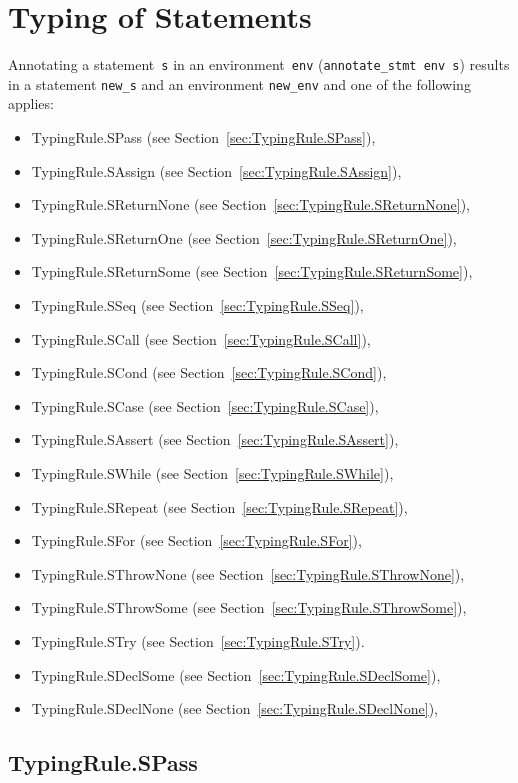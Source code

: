 \documentclass{book}
\begin{document}
\chapter{Typing of Statements}
Annotating a statement~\texttt{s} in an environment~\texttt{env}
(\texttt{annotate\_stmt env s}) results in a statement \texttt{new\_s} and an
environment \texttt{new\_env} and one of the following applies:
\begin{itemize}
\item TypingRule.SPass (see Section~\ref{sec:TypingRule.SPass}),
\item TypingRule.SAssign (see Section~\ref{sec:TypingRule.SAssign}),
\item TypingRule.SReturnNone (see Section~\ref{sec:TypingRule.SReturnNone}),
\item TypingRule.SReturnOne (see Section~\ref{sec:TypingRule.SReturnOne}),
\item TypingRule.SReturnSome (see Section~\ref{sec:TypingRule.SReturnSome}),
\item TypingRule.SSeq (see Section~\ref{sec:TypingRule.SSeq}),
\item TypingRule.SCall (see Section~\ref{sec:TypingRule.SCall}),
\item TypingRule.SCond (see Section~\ref{sec:TypingRule.SCond}),
\item TypingRule.SCase (see Section~\ref{sec:TypingRule.SCase}),
\item TypingRule.SAssert (see Section~\ref{sec:TypingRule.SAssert}),
\item TypingRule.SWhile (see Section~\ref{sec:TypingRule.SWhile}),
\item TypingRule.SRepeat (see Section~\ref{sec:TypingRule.SRepeat}),
\item TypingRule.SFor (see Section~\ref{sec:TypingRule.SFor}),
\item TypingRule.SThrowNone (see Section~\ref{sec:TypingRule.SThrowNone}),
\item TypingRule.SThrowSome (see Section~\ref{sec:TypingRule.SThrowSome}),
\item TypingRule.STry (see Section~\ref{sec:TypingRule.STry}).
\item TypingRule.SDeclSome (see Section~\ref{sec:TypingRule.SDeclSome}),
\item TypingRule.SDeclNone (see Section~\ref{sec:TypingRule.SDeclNone}),
\end{itemize}

\section{TypingRule.SPass \label{sec:TypingRule.SPass}}
\end{document}
